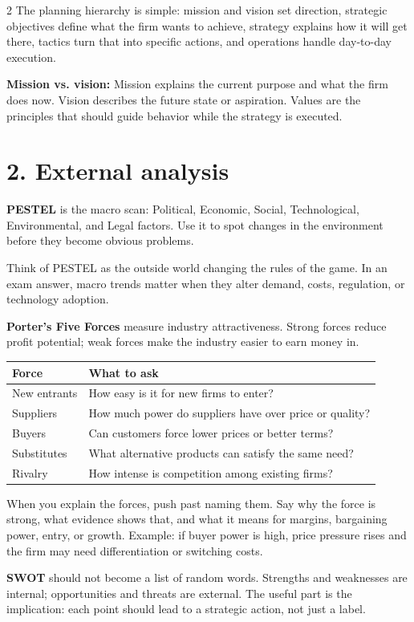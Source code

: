 \documentclass[8pt,letterpaper]{article}
\newcommand{\term}[1]{\textbf{#1}}
\begin{document}
\begin{multicols}{2}
The planning hierarchy is simple: mission and vision set direction, strategic objectives define what the firm wants to achieve, strategy explains how it will get there, tactics turn that into specific actions, and operations handle day-to-day execution.

\term{Mission vs. vision:} Mission explains the current purpose and what the firm does now. Vision describes the future state or aspiration. Values are the principles that should guide behavior while the strategy is executed.

\section*{2. External analysis}
\term{PESTEL} is the macro scan: Political, Economic, Social, Technological, Environmental, and Legal factors. Use it to spot changes in the environment before they become obvious problems.

Think of PESTEL as the outside world changing the rules of the game. In an exam answer, macro trends matter when they alter demand, costs, regulation, or technology adoption.

\term{Porter's Five Forces} measure industry attractiveness. Strong forces reduce profit potential; weak forces make the industry easier to earn money in.

\begin{tabular}{@{}p{2.1cm}p{4.4cm}@{}}
\toprule
\term{Force} & \term{What to ask} \\
\midrule
New entrants & How easy is it for new firms to enter? \\
Suppliers & How much power do suppliers have over price or quality? \\
Buyers & Can customers force lower prices or better terms? \\
Substitutes & What alternative products can satisfy the same need? \\
Rivalry & How intense is competition among existing firms? \\
\bottomrule
\end{tabular}

When you explain the forces, push past naming them. Say why the force is strong, what evidence shows that, and what it means for margins, bargaining power, entry, or growth. Example: if buyer power is high, price pressure rises and the firm may need differentiation or switching costs.

\term{SWOT} should not become a list of random words. Strengths and weaknesses are internal; opportunities and threats are external. The useful part is the implication: each point should lead to a strategic action, not just a label.


\end{multicols}
\end{document}
